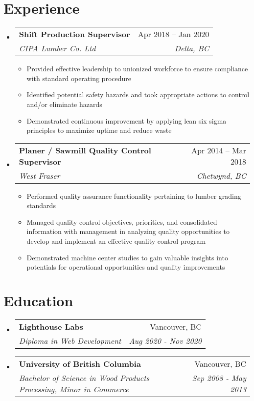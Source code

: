 \documentclass[letterpaper,10.5pt]{article}
\makeatletter
\newcommand{\resumeItem}[1]{
  \item\small{
    {#1 \vspace{-2pt}}
  }
}
\newcommand{\resumeSubheading}[4]{
  \vspace{-2pt}\item
    \begin{tabular*}{0.97\textwidth}[t]{l@{\extracolsep{\fill}}r}
      \textbf{#1} & #2 \\
      \textit{\small#3} & \textit{\small #4} \\
    \end{tabular*}\vspace{-7pt}
}
\newcommand{\resumeSubHeadingListStart}{\begin{itemize}[leftmargin=0.15in, label={}]}
\newcommand{\resumeSubHeadingListEnd}{\end{itemize}}
\newcommand{\resumeItemListStart}{\begin{itemize}}
\newcommand{\resumeItemListEnd}{\end{itemize}\vspace{-5pt}}
\makeatother
\begin{document}
\section{Experience}
  \resumeSubHeadingListStart

    \resumeSubheading
      {Shift Production Supervisor}{Apr 2018 -- Jan 2020}
      {CIPA Lumber Co. Ltd}{Delta, BC}
      \resumeItemListStart
        \resumeItem{Provided effective leadership to unionized workforce to ensure compliance with standard operating procedure}
        \resumeItem{Identified potential safety hazards and took appropriate actions to control and/or eliminate hazards }
        \resumeItem{Demonstrated continuous improvement by applying lean six sigma principles to maximize uptime and reduce waste}
      \resumeItemListEnd

    \resumeSubheading
      {Planer / Sawmill Quality Control Supervisor}{Apr 2014 -- Mar 2018}
      {West Fraser}{Chetwynd, BC}
      \resumeItemListStart
        \resumeItem{Performed quality assurance functionality pertaining to lumber grading standards  }
        \resumeItem{Managed quality control objectives, priorities, and consolidated information with management in analyzing quality opportunities to develop and implement an effective quality control program}
        \resumeItem{Demonstrated machine center studies to gain valuable insights into potentials for operational opportunities and quality improvements}
    \resumeItemListEnd


  \resumeSubHeadingListEnd
  
\section{Education}
  \resumeSubHeadingListStart
    \resumeSubheading
      {Lighthouse Labs}{Vancouver, BC}
      {Diploma in Web Development}{Aug 2020 - Nov 2020}
    \resumeSubheading
      {University of British Columbia}{Vancouver, BC}
      {Bachelor of Science in Wood Products Processing, Minor in Commerce}{Sep 2008 - May 2013}
  \resumeSubHeadingListEnd







\end{document}
